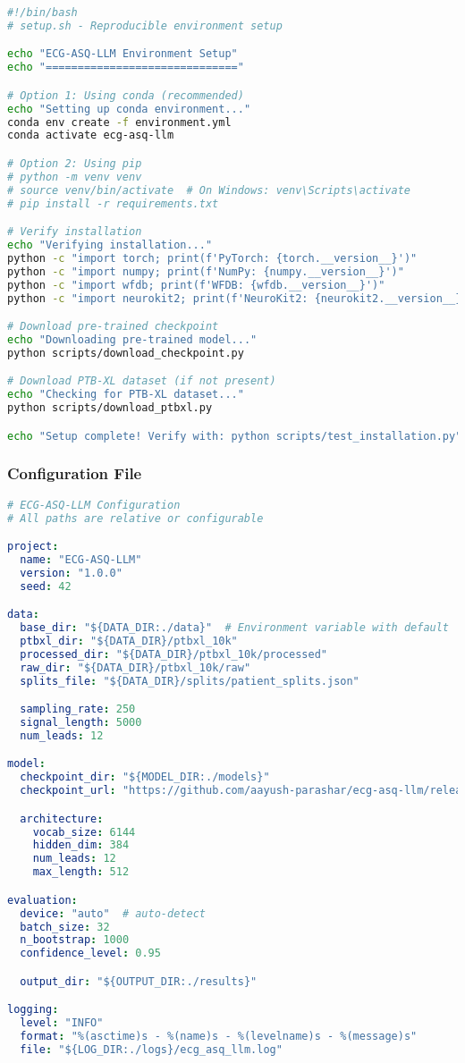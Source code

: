 \documentclass[11pt]{article}
\begin{document}
\begin{lstlisting}[language=bash, caption=Complete Setup Script]
#!/bin/bash
# setup.sh - Reproducible environment setup

echo "ECG-ASQ-LLM Environment Setup"
echo "=============================="

# Option 1: Using conda (recommended)
echo "Setting up conda environment..."
conda env create -f environment.yml
conda activate ecg-asq-llm

# Option 2: Using pip
# python -m venv venv
# source venv/bin/activate  # On Windows: venv\Scripts\activate
# pip install -r requirements.txt

# Verify installation
echo "Verifying installation..."
python -c "import torch; print(f'PyTorch: {torch.__version__}')"
python -c "import numpy; print(f'NumPy: {numpy.__version__}')"
python -c "import wfdb; print(f'WFDB: {wfdb.__version__}')"
python -c "import neurokit2; print(f'NeuroKit2: {neurokit2.__version__}')"

# Download pre-trained checkpoint
echo "Downloading pre-trained model..."
python scripts/download_checkpoint.py

# Download PTB-XL dataset (if not present)
echo "Checking for PTB-XL dataset..."
python scripts/download_ptbxl.py

echo "Setup complete! Verify with: python scripts/test_installation.py"
\end{lstlisting}

\subsubsection{Configuration File}

\begin{lstlisting}[language=yaml, caption=config.yaml - No Hard-Coded Paths]
# ECG-ASQ-LLM Configuration
# All paths are relative or configurable

project:
  name: "ECG-ASQ-LLM"
  version: "1.0.0"
  seed: 42

data:
  base_dir: "${DATA_DIR:./data}"  # Environment variable with default
  ptbxl_dir: "${DATA_DIR}/ptbxl_10k"
  processed_dir: "${DATA_DIR}/ptbxl_10k/processed"
  raw_dir: "${DATA_DIR}/ptbxl_10k/raw"
  splits_file: "${DATA_DIR}/splits/patient_splits.json"

  sampling_rate: 250
  signal_length: 5000
  num_leads: 12

model:
  checkpoint_dir: "${MODEL_DIR:./models}"
  checkpoint_url: "https://github.com/aayush-parashar/ecg-asq-llm/releases/download/v1.0.0/model_checkpoint.pt"

  architecture:
    vocab_size: 6144
    hidden_dim: 384
    num_leads: 12
    max_length: 512

evaluation:
  device: "auto"  # auto-detect
  batch_size: 32
  n_bootstrap: 1000
  confidence_level: 0.95

  output_dir: "${OUTPUT_DIR:./results}"

logging:
  level: "INFO"
  format: "%(asctime)s - %(name)s - %(levelname)s - %(message)s"
  file: "${LOG_DIR:./logs}/ecg_asq_llm.log"
\end{lstlisting}
\end{document}
